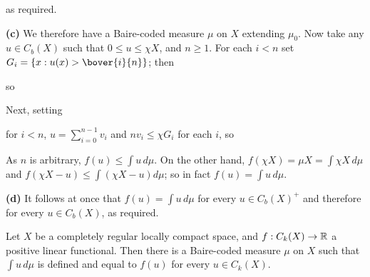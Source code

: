 {

\noindent as required.\ \Qed

\medskip

{\bf (c)} We therefore have a Baire-coded measure $\mu$ on $X$ extending
$\mu_0$.   Now take any $u\in C_b(X)$ such that $0\le u\le\chi X$, and
$n\ge 1$.   For each $i<n$ set $G_i=\{x:u(x)>\bover{i}{n}\}$;  then


\noindent so


\noindent Next, setting


\noindent for $i<n$, $u=\sum_{i=0}^{n-1}v_i$ and $nv_i\le\chi G_i$ for
each $i$, so


\noindent As $n$ is arbitrary, $f(u)\le\int u\,d\mu$.   On the other hand,
$f(\chi X)=\mu X=\int\chi X\,d\mu$ and $f(\chi X-u)\le\int(\chi X-u)d\mu$;
so in fact $f(u)=\int u\,d\mu$.

\medskip

{\bf (d)} It follows at once that $f(u)=\int u\,d\mu$ for every
$u\in C_b(X)^+$ and therefore for every $u\in C_b(X)$, as required.
}%

 Let $X$ be a completely
regular locally compact space, and $f:C_k(X)\to\Bbb R$ a positive
linear functional.
Then there is a Baire-coded measure $\mu$ on $X$ such
that $\int u\,d\mu$ is defined and equal to $f(u)$ for every $u\in C_k(X)$.

